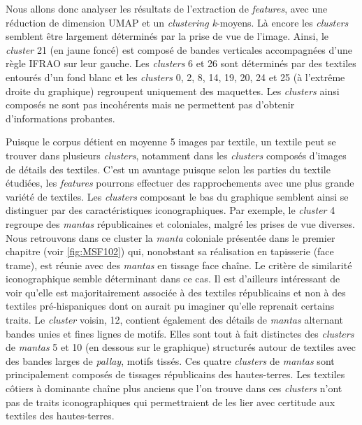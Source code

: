 Nous allons donc analyser les résultats de l'extraction de \textit{features}, avec une réduction de dimension UMAP et un \textit{clustering k}-moyens.
Là encore les  \textit{clusters} semblent être largement déterminés par la prise de vue de l'image. Ainsi, le \textit{cluster} 21 (en jaune foncé) est composé de bandes verticales accompagnées d'une règle IFRAO sur leur gauche. Les \textit{clusters} 6 et 26 sont déterminés par des textiles entourés d'un fond blanc et les \textit{clusters} 0, 2, 8, 14, 19, 20, 24 et 25 (à l'extrême droite du graphique) regroupent uniquement des maquettes. Les \textit{clusters} ainsi composés ne sont pas incohérents mais ne permettent pas d'obtenir d'informations probantes. 

Puisque le corpus détient en moyenne 5 images par textile, un textile peut se trouver dans plusieurs \textit{clusters}, notamment dans les \textit{clusters} composés d'images de détails des textiles. C'est un avantage puisque selon les parties du textile étudiées, les \textit{features} pourrons effectuer des rapprochements avec une plus grande variété de textiles. Les \textit{clusters} composant le bas du graphique semblent ainsi se distinguer par des caractéristiques iconographiques. Par exemple, le \textit{cluster} 4 regroupe des \textit{mantas} républicaines et coloniales, malgré les prises de vue diverses. Nous retrouvons dans ce cluster la \textit{manta} coloniale présentée dans le premier chapitre (voir \ref{fig:MSF102}) qui, nonobstant sa réalisation en tapisserie (face trame), est réunie avec des \textit{mantas} en tissage face chaîne. Le critère de similarité iconographique semble déterminant dans ce cas. Il est d'ailleurs intéressant de voir qu'elle est majoritairement associée à des textiles républicains et non à des textiles pré-hispaniques dont on aurait pu imaginer qu'elle reprenait certains traits. Le \textit{cluster} voisin, 12, contient également des détails de \textit{mantas} alternant bandes unies et fines lignes de motifs. Elles sont tout à fait distinctes des \textit{clusters} de \textit{mantas} 5 et 10 (en dessous sur le graphique) structurés autour de textiles avec des bandes larges de \textit{pallay}, motifs tissés. Ces quatre \textit{clusters} de \textit{mantas} sont principalement composés de tissages républicains des hautes-terres. Les textiles côtiers à dominante chaîne plus anciens que l'on trouve dans ces \textit{clusters} n'ont pas de traits iconographiques qui permettraient de les lier avec certitude aux textiles des hautes-terres.


%


